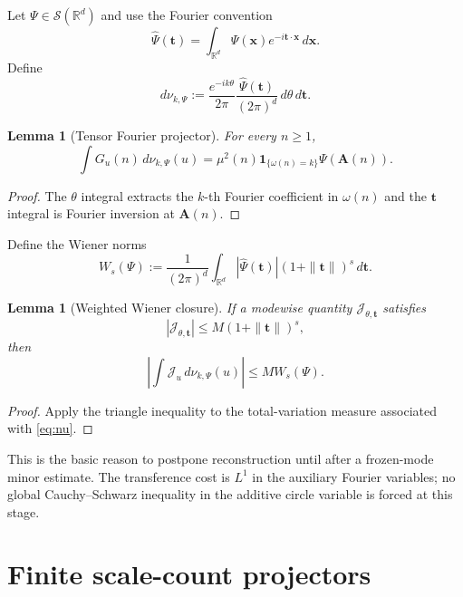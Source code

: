 \documentclass[11pt]{article}
\newtheorem{lemma}[theorem]{Lemma}
\theoremstyle{definition}
\theoremstyle{remark}
\newcommand{\1}{\mathbf 1}
\begin{document}
Let $\Psi\in\mathcal S(\mathbb R^d)$ and use the Fourier convention
\[
\widehat\Psi(\bm t)=\int_{\mathbb R^d}\Psi(\bm x)e^{-i\bm t\cdot\bm x}\,d\bm x.
\]
Define
\begin{equation}\label{eq:nu}
d\nu_{k,\Psi}
:=
\frac{e^{-ik\theta}}{2\pi}
\frac{\widehat\Psi(\bm t)}{(2\pi)^d}
\,d\theta\,d\bm t.
\end{equation}

\begin{lemma}[Tensor Fourier projector]\label{lem:tensor}
For every $n\ge1$,
\begin{equation}\label{eq:tensor}
\int G_u(n)\,d\nu_{k,\Psi}(u)
=
\mu^2(n)\1_{\{\omega(n)=k\}}\Psi(\bm A(n)).
\end{equation}
\end{lemma}

\begin{proof}
The $\theta$ integral extracts the $k$-th Fourier coefficient in $\omega(n)$ and the $\bm t$ integral is Fourier inversion at $\bm A(n)$.
\end{proof}

Define the Wiener norms
\begin{equation}\label{eq:Ws}
W_s(\Psi)
:=
\frac{1}{(2\pi)^d}
\int_{\mathbb R^d}|\widehat\Psi(\bm t)|(1+\|\bm t\|)^s\,d\bm t.
\end{equation}

\begin{lemma}[Weighted Wiener closure]\label{lem:wiener}
If a modewise quantity $\mathcal J_{\theta,\bm t}$ satisfies
\[
|\mathcal J_{\theta,\bm t}|
\le M(1+\|\bm t\|)^s,
\]
then
\begin{equation}\label{eq:wiener-transfer}
\left|\int \mathcal J_u\,d\nu_{k,\Psi}(u)\right|
\le M W_s(\Psi).
\end{equation}
\end{lemma}

\begin{proof}
Apply the triangle inequality to the total-variation measure associated with \eqref{eq:nu}.
\end{proof}

This is the basic reason to postpone reconstruction until after a frozen-mode minor estimate.  The transference cost is $L^1$ in the auxiliary Fourier variables; no global Cauchy--Schwarz inequality in the additive circle variable is forced at this stage.

\section{Finite scale-count projectors}
\end{document}
